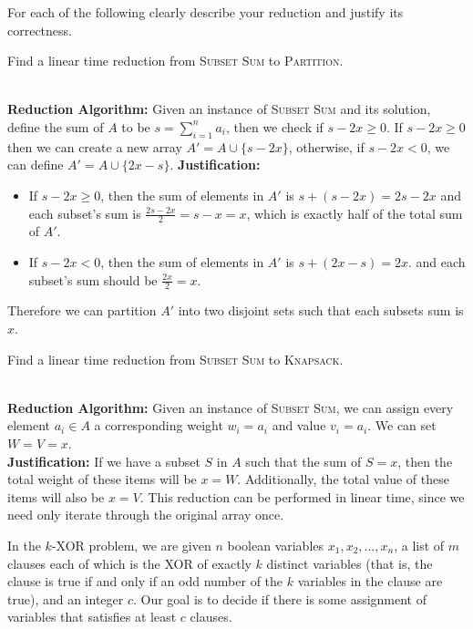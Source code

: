 \documentclass[11pt]{article}
\begin{document}
\noindent For each of the following clearly describe your reduction and justify its correctness.
\begin{subparts}
\subpart Find a linear time reduction from \textsc{Subset Sum} to \textsc{Partition}.\\
\begin{solution}\\
    \textbf{Reduction Algorithm: }Given an instance of \textsc{Subset Sum} and its solution, define the sum of $A$ to be $s = \sum_{i=1}^{n}a_i$, then we check if $s-2x \geq 0$. If $s-2x \geq 0$ then we can create 
    a new array $A'=A \cup \{s-2x\}$, otherwise, if $s-2x < 0$, we can define $A'=A \cup \{2x-s\}$.
    \textbf{Justification: } 
    \begin{itemize}
        \item If $s - 2x \geq 0$, then the sum of elements in $A'$ is $s + (s - 2x) = 2s - 2x$ and each subset's sum is $\frac{2s - 2x}{2} = s - x = x$, which is exactly half of the total sum of $A'$. 
        \item If $s - 2x < 0$, then the sum of elements in $A'$ is $s + (2x - s) = 2x$. and each subset's sum should be $\frac{2x}{2} = x$.
    \end{itemize}
    Therefore we can partition $A'$ into two disjoint sets such that each subsets sum is $x$.
\end{solution}
\newpage
\subpart Find a linear time reduction from \textsc{Subset Sum} to \textsc{Knapsack}.\\
\begin{solution}\\
    \textbf{Reduction Algorithm:} Given an instance of \textsc{Subset Sum}, we can assign every element $a_i \in A$ a corresponding weight $w_i = a_i$ and value $v_i = a_i$. We can set $W = V = x$.\\
    \textbf{Justification:} If we have a subset $S$ in $A$ such that the sum of $S = x$, then the total weight of these items will be $x = W$. Additionally, the total value of these items will also be $x = V$. This reduction can be performed in linear time, since we need only iterate through the original array once.
\end{solution}
\end{subparts}

\newpage


In the $k$-XOR problem, we are given $n$ boolean variables $x_1, x_2, \ldots, x_n$, a list of $m$ clauses each of which is the XOR of exactly $k$ distinct variables (that is, the clause is true if and only if an odd number of the $k$ variables in the clause are true), and an integer $c$. Our goal is to decide if there is some assignment of variables that satisfies at least $c$ clauses.
\end{document}
